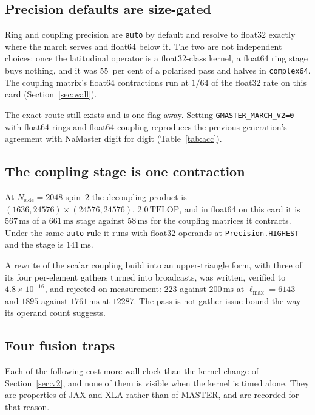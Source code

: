\documentclass[usenatbib,useAMS]{mnras}
\begin{document}
\subsection{Precision defaults are size-gated}

Ring and coupling precision are \texttt{auto} by default and resolve to float32 exactly where the march serves and float64 below it. The two are not independent choices: once the latitudinal operator is a float32-class kernel, a float64 ring stage buys nothing, and it was $55$~per cent of a polarised pass and halves in \texttt{complex64}. The coupling matrix's float64 contractions run at $1/64$ of the float32 rate on this card (Section~\ref{sec:wall}).

The exact route still exists and is one flag away. Setting \texttt{GMASTER\_MARCH\_V2=0} with float64 rings and float64 coupling reproduces the previous generation's agreement with NaMaster digit for digit (Table~\ref{tab:acc}).

\subsection{The coupling stage is one contraction}

At $N_{\mathrm{side}}=2048$ spin~$2$ the decoupling product is $(1636,24576)\times(24576,24576)$, $2.0\,\mathrm{TFLOP}$, and in float64 on this card it is $567\,\mathrm{ms}$ of a $661\,\mathrm{ms}$ stage against $58\,\mathrm{ms}$ for the coupling matrices it contracts. Under the same \texttt{auto} rule it runs with float32 operands at \texttt{Precision.HIGHEST} and the stage is $141\,\mathrm{ms}$.

A rewrite of the scalar coupling build into an upper-triangle form, with three of its four per-element gathers turned into broadcasts, was written, verified to $4.8\times10^{-16}$, and rejected on measurement: $223$ against $200\,\mathrm{ms}$ at $\ell_{\max}=6143$ and $1895$ against $1761\,\mathrm{ms}$ at $12287$. The pass is not gather-issue bound the way its operand count suggests.

\subsection{Four fusion traps}
\label{sec:fusion}

Each of the following cost more wall clock than the kernel change of Section~\ref{sec:v2}, and none of them is visible when the kernel is timed alone. They are properties of JAX and XLA rather than of MASTER, and are recorded for that reason.
\end{document}
